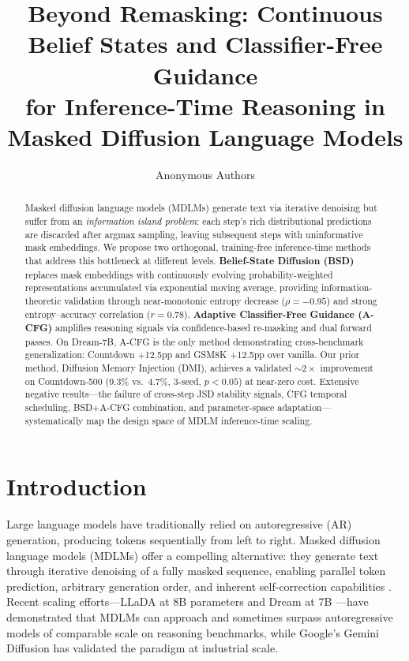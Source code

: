 \documentclass{article}
\title{Beyond Remasking: Continuous Belief States and Classifier-Free Guidance\\for Inference-Time Reasoning in Masked Diffusion Language Models}
\author{
  Anonymous Authors
}
\begin{document}
\maketitle

\begin{abstract}
Masked diffusion language models (MDLMs) generate text via iterative denoising but suffer from an \emph{information island problem}: each step's rich distributional predictions are discarded after argmax sampling, leaving subsequent steps with uninformative mask embeddings. We propose two orthogonal, training-free inference-time methods that address this bottleneck at different levels. \textbf{Belief-State Diffusion (BSD)} replaces mask embeddings with continuously evolving probability-weighted representations accumulated via exponential moving average, providing information-theoretic validation through near-monotonic entropy decrease ($\rho = -0.95$) and strong entropy--accuracy correlation ($r = 0.78$). \textbf{Adaptive Classifier-Free Guidance (A-CFG)} amplifies reasoning signals via confidence-based re-masking and dual forward passes. On Dream-7B, A-CFG is the only method demonstrating cross-benchmark generalization: Countdown +12.5pp and GSM8K +12.5pp over vanilla. Our prior method, Diffusion Memory Injection (DMI), achieves a validated ${\sim}2{\times}$ improvement on Countdown-500 (9.3\% vs.\ 4.7\%, 3-seed, $p < 0.05$) at near-zero cost. Extensive negative results---the failure of cross-step JSD stability signals, CFG temporal scheduling, BSD+A-CFG combination, and parameter-space adaptation---systematically map the design space of MDLM inference-time scaling.
\end{abstract}

\section{Introduction}
\label{sec:intro}

Large language models have traditionally relied on autoregressive (AR) generation, producing tokens sequentially from left to right. Masked diffusion language models (MDLMs) offer a compelling alternative: they generate text through iterative denoising of a fully masked sequence, enabling parallel token prediction, arbitrary generation order, and inherent self-correction capabilities \citep{sahoo2024mdlm, shi2024mdlm}. Recent scaling efforts---LLaDA at 8B parameters \citep{nie2025llada} and Dream at 7B \citep{liu2025dream}---have demonstrated that MDLMs can approach and sometimes surpass autoregressive models of comparable scale on reasoning benchmarks, while Google's Gemini Diffusion \citep{geminidiffusion2025} has validated the paradigm at industrial scale.
\end{document}
